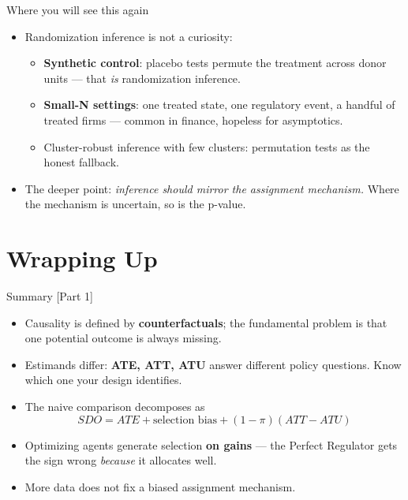 \documentclass[
  11pt,
  ignorenonframetext,
  aspectratio=169,
]{beamer}
\providecommand{\tightlist}{%
  \setlength{\itemsep}{0pt}\setlength{\parskip}{0pt}}
\begin{document}
\begin{frame}{Where you will see this again}
\protect{}\label{where-you-will-see-this-again}
\begin{itemize}
\tightlist
\item
  Randomization inference is not a curiosity:

  \begin{itemize}
  \tightlist
  \item
    \textbf{Synthetic control}: placebo tests permute the treatment
    across donor units --- that \emph{is} randomization inference.
  \item
    \textbf{Small-N settings}: one treated state, one regulatory event,
    a handful of treated firms --- common in finance, hopeless for
    asymptotics.
  \item
    Cluster-robust inference with few clusters: permutation tests as the
    honest fallback.
  \end{itemize}
\item
  The deeper point: \emph{inference should mirror the assignment
  mechanism.} Where the mechanism is uncertain, so is the p-value.
\end{itemize}
\end{frame}

\section{Wrapping Up}\label{wrapping-up}

\begin{frame}{Summary {[}Part 1{]}}
\protect{}\label{summary-part-1}
\begin{itemize}
\tightlist
\item
  Causality is defined by \textbf{counterfactuals}; the fundamental
  problem is that one potential outcome is always missing.
\item
  Estimands differ: \textbf{ATE, ATT, ATU} answer different policy
  questions. Know which one your design identifies.
\item
  The naive comparison decomposes as \[
  SDO = ATE + \text{selection bias} + (1-\pi)(ATT - ATU)
  \]
\item
  Optimizing agents generate selection \textbf{on gains} --- the Perfect
  Regulator gets the sign wrong \emph{because} it allocates well.
\item
  More data does not fix a biased assignment mechanism.
\end{itemize}
\end{frame}
\end{document}
